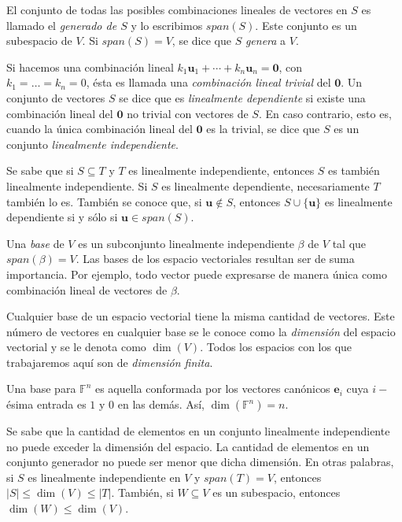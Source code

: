             El conjunto de todas las posibles combinaciones lineales de vectores en $S$ es llamado el \textit{generado de $S$} y lo escribimos $span(S)$. Este conjunto es un subespacio de $V$. Si $span(S) = V$, se dice que $S$ \textit{genera} a $V$.

            Si hacemos una combinación lineal $k_{1}\mathbf{u}_{1} + \cdots +k_{n}\mathbf{u}_{n} = \mathbf{0} $, con \\ $k_{1} = \ldots= k_{n} = 0$, ésta es llamada una \textit{combinación lineal trivial} del $\mathbf{0}$. Un conjunto de vectores $S$ se dice que es \textit{linealmente dependiente} si existe una combinación lineal del $\mathbf{0}$ no trivial con vectores de $S$. En caso contrario, esto es, cuando la única combinación lineal del $\mathbf{0}$ es la trivial, se dice que $S$ es un conjunto \textit{linealmente independiente}.

            Se sabe que si $S \subseteq T$ y $T$ es linealmente independiente, entonces $S$ es también linealmente independiente. Si $S$ es linealmente dependiente, necesariamente $T$ también lo es. También se conoce que, si $\mathbf{u} \notin S$, entonces $S\cup \{\mathbf{u}\}$ es linealmente dependiente si y sólo si $\mathbf{u} \in span(S)$.

            Una \textit{base} de $V$ es un subconjunto linealmente independiente $\beta$ de $V$ tal que $span(\beta) = V$. Las bases de los espacio vectoriales resultan ser de suma importancia. Por ejemplo, todo vector puede expresarse de manera única como combinación lineal de vectores de $\beta$.

            Cualquier base de un espacio vectorial tiene la misma cantidad de vectores. Este número de vectores en cualquier base se le conoce como la \textit{dimensión} del espacio vectorial y se le denota como $\dim(V)$. Todos los espacios con los que trabajaremos aquí son de \textit{dimensión finita}.


            Una base para $\mathbb{F}^{n}$ es aquella conformada por los vectores canónicos $\mathbf{e}_{i}$ cuya $i-$ésima entrada es $1$ y $0$ en las demás. Así, $\dim(\mathbb{F}^{n}) = n$.

            Se sabe que la cantidad de elementos en un conjunto linealmente independiente no puede exceder la dimensión del espacio. La cantidad de elementos en un conjunto generador no puede ser menor que dicha dimensión. En otras palabras, si $S$ es linealmente independiente en $V$ y $span(T)=V$, entonces $|S| \leq \dim(V) \leq |T|$. También, si $W \subseteq V$ es un subespacio, entonces $\dim(W) \leq \dim(V)$.

